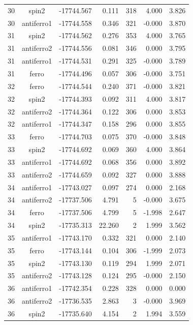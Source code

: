 \begin{longtable}{@{}ccrrrrr@{}}
30 & spin2 & -17744.567 & 0.111 & 318 & 4.000 & 3.826 \\
30 & antiferro1 & -17744.558 & 0.346 & 321 & -0.000 & 3.870 \\
\rowcolor{gray!20} 31 & spin2 & -17744.562 & 0.276 & 353 & 4.000 & 3.765 \\
31 & antiferro2 & -17744.556 & 0.081 & 346 & 0.000 & 3.795 \\
31 & antiferro1 & -17744.531 & 0.291 & 325 & -0.000 & 3.789 \\
31 & ferro & -17744.496 & 0.057 & 306 & -0.000 & 3.751 \\
\rowcolor{gray!20} 32 & ferro & -17744.544 & 0.240 & 371 & -0.000 & 3.821 \\
32 & spin2 & -17744.393 & 0.092 & 311 & 4.000 & 3.817 \\
32 & antiferro2 & -17744.364 & 0.122 & 306 & 0.000 & 3.853 \\
32 & antiferro1 & -17744.347 & 0.158 & 296 & 0.000 & 3.855 \\
\rowcolor{gray!20} 33 & ferro & -17744.703 & 0.075 & 370 & -0.000 & 3.848 \\
33 & spin2 & -17744.692 & 0.069 & 360 & 4.000 & 3.864 \\
33 & antiferro1 & -17744.692 & 0.068 & 356 & 0.000 & 3.892 \\
33 & antiferro2 & -17744.659 & 0.092 & 327 & 0.000 & 3.888 \\
\rowcolor{gray!20} 34 & antiferro1 & -17743.027 & 0.097 & 274 & 0.000 & 2.168 \\
34 & antiferro2 & -17737.506 & 4.791 & 5 & -0.000 & 3.675 \\
34 & ferro & -17737.506 & 4.799 & 5 & -1.998 & 2.647 \\
34 & spin2 & -17735.313 & 22.260 & 2 & 1.999 & 3.562 \\
\rowcolor{gray!20} 35 & antiferro1 & -17743.170 & 0.332 & 321 & 0.000 & 2.140 \\
35 & ferro & -17743.144 & 0.104 & 306 & -1.999 & 2.073 \\
35 & spin2 & -17743.130 & 0.119 & 294 & 1.999 & 2.071 \\
35 & antiferro2 & -17743.128 & 0.124 & 295 & -0.000 & 2.150 \\
\rowcolor{gray!20} 36 & antiferro1 & -17742.354 & 0.228 & 328 & 0.000 & 0.000 \\
36 & antiferro2 & -17736.535 & 2.863 & 3 & -0.000 & 3.969 \\
36 & spin2 & -17735.640 & 4.154 & 2 & 1.994 & 3.559 \\

\end{longtable}

